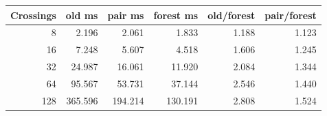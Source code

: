\begin{center}\small
\begin{tabular}{@{}rrrrrr@{}}
\toprule
Crossings & old ms & pair ms & forest ms & old/forest & pair/forest \\
\midrule
8 & 2.196 & 2.061 & 1.833 & 1.188 & 1.123 \\
16 & 7.248 & 5.607 & 4.518 & 1.606 & 1.245 \\
32 & 24.987 & 16.061 & 11.920 & 2.084 & 1.344 \\
64 & 95.567 & 53.731 & 37.144 & 2.546 & 1.440 \\
128 & 365.596 & 194.214 & 130.191 & 2.808 & 1.524 \\
\bottomrule
\end{tabular}
\end{center}
